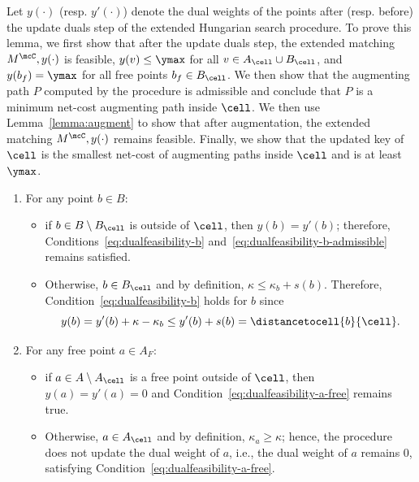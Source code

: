 Let $y(\cdot)$ (resp. $y'(\cdot)$) denote the dual weights of the points after (resp. before) the update duals step of the extended Hungarian search procedure. To prove this lemma, we first show that after the update duals step, the extended matching $M^\mcC, y(\cdot)$ is feasible, $y(v)\le \ymax$ for all $v\in A_\cell\cup B_\cell$, and $y(b_f)=\ymax$ for all free points $b_f\in B_\cell$. We then show that the augmenting path $P$ computed by the procedure is admissible and conclude that $P$ is a minimum net-cost augmenting path inside $\cell$. We then use Lemma~\ref{lemma:augment} to show that after augmentation, the extended matching $M^\mcC, y(\cdot)$ remains feasible. Finally, we show that the updated key of $\cell$ is the smallest net-cost of augmenting paths inside $\cell$ and is at least $\ymax$.

    \begin{enumerate}
        \item For any point $b\in B$:
        \begin{itemize}
            \item if $b\in B\setminus B_\cell$ is outside of $\cell$, then $y(b)=y'(b)$; therefore, Conditions~\eqref{eq:dualfeasibility-b} and~\eqref{eq:dualfeasibility-b-admissible} remains satisfied.
            \item Otherwise, $b\in B_\cell$ and by definition, $\kappa\le \kappa_b+s(b)$. Therefore, Condition~\eqref{eq:dualfeasibility-b} holds for $b$ since 
            \begin{equation}\label{eq:global-hung-2}
                y(b) = y'(b) + \kappa - \kappa_b \le y'(b) + s(b) =\distancetocell{b}{\cell}. 
            \end{equation}
        \end{itemize}
        \item For any free point $a\in A_F$:
        \begin{itemize}
            \item if $a\in A\setminus A_\cell$ is a free point outside of $\cell$, then $y(a)=y'(a)=0$ and Condition~\eqref{eq:dualfeasibility-a-free} remains true. 
            \item Otherwise, $a\in A_\cell$ and by definition, $\kappa_a\ge \kappa$; hence, the procedure does not update the dual weight of $a$, i.e., the dual weight of $a$ remains $0$, satisfying Condition~\eqref{eq:dualfeasibility-a-free}. 
        \end{itemize}
        
    \end{enumerate}

